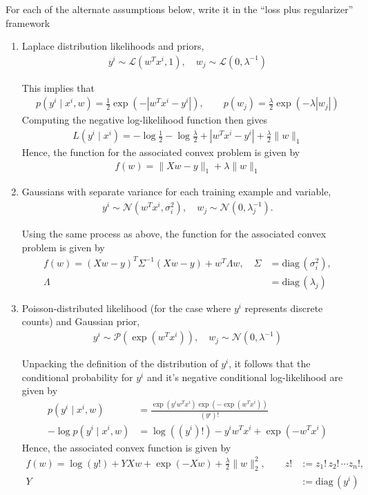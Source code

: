 \documentclass{article}
\begin{document}
For each of the alternate assumptions below, write it in the “loss
plus regularizer” framework
\begin{enumerate}
\item Laplace distribution likelihoods and priors,
  \begin{align*}
    y^i \sim \mathcal{L}(w^T x^i, 1), \quad w_j \sim \mathcal{L}(0, \lambda^{-1})
  \end{align*}
  \soln

  This implies that
  \begin{align*}
    p( y^i \mid x^i, w) = \frac{1}{2} \exp(-|w^T x^i - y^i| ), \qquad p(w_j) =
    \frac{\lambda}{2} \exp ( -\lambda |w_j|)
  \end{align*}
  Computing the negative log-likelihood function then gives
  \begin{align*}
    L(y^i \mid x^i) = - \log \frac{1}{2} - \log \frac{\lambda}{2} + |w^T x^i -
    y^i| + \frac{\lambda}{2} \|w\|_1 
  \end{align*}
  Hence, the function for the associated convex problem is given by 
  \begin{align*}
    f(w) = \|Xw - y\|_1 + \lambda \|w\|_1
  \end{align*}

  
\item Gaussians with separate variance for each training example and variable,
  \begin{align*}
    y^i \sim \mathcal{N}(w^Tx^i, \sigma_i^2), \quad w_j \sim \mathcal{N}(0, \lambda_j^{-1}).
  \end{align*}
  \soln

  Using the same process as above, the function for the associated convex
  problem is given by
  \begin{align*}
    f(w) = (Xw - y)^T \Sigma^{-1} (Xw - y) + w^T \Lambda w, \quad \Sigma &=
    \mathrm{diag}\,(\sigma_i^2), \\\Lambda &= \mathrm{diag}\,(\lambda_j)
  \end{align*}
\item Poisson-distributed likelihood (for the case where $y^i$ represents discrete counts) and Gaussian prior,
  \begin{align*}
    y^i \sim \mathcal{P}(\exp(w^T x^i)), \quad w_j \sim \mathcal{N}(0, \lambda^{-1})
  \end{align*}
  \soln

  Unpacking the definition of the distribution of $y^i$, it follows that the
  conditional probability for $y^i$ and it's negative conditional
  log-likelihood are given by 
  \begin{align*}
    p(y^i \mid x^i, w) &= \frac{\exp(y^i w^T x^i)\exp(-\exp(w^T x^i))}{(y^i)!}\\
    -\log p(y^i \mid x^i, w) &= \log((y^i)!) - y^i w^T x^i + \exp(-w^T x^i)
  \end{align*}
  Hence, the associated convex function is given by
  \begin{align*}
    f(w) = \log (y!) + YXw + \exp(-Xw) + \frac{\lambda}{2} \|w\|_2^2, \qquad z!
    &:= z_1!\,z_2!\,\cdots z_n!,\\ Y &:= \mathrm{diag}\,(y^i)
  \end{align*}





\end{enumerate}
\end{document}
